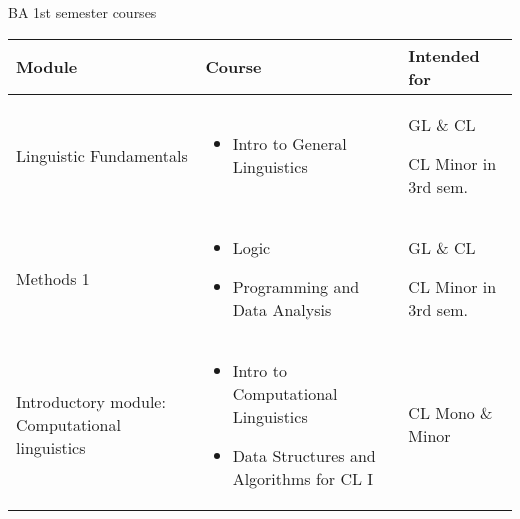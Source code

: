 \documentclass[aspectratio=169,hyperref={unicode},xcolor={dvipsnames}]{beamer}
\begin{document}
\begin{frame}{BA 1st semester courses}
\small
	\begin{center}
	\begin{table}[h]
		\begin{tabular}{p{}|p{}|p{}} 
		Module & Course & Intended for\\
		\hline
		Linguistic Fundamentals & \begin{itemize}\item Intro to General Linguistics\end{itemize} & GL \& CL \newline \begin{footnotesize}CL Minor in 3rd sem.\end{footnotesize}\\
		\hline
		Methods 1 & \begin{itemize}\item Logic \item Programming and Data Analysis\end{itemize} &  GL \& CL \newline \begin{footnotesize}CL Minor in 3rd sem.\end{footnotesize}\\
		\hline
		Introductory module: \newline Computational linguistics &  \begin{itemize}\item Intro to Computational Linguistics \item Data Structures and Algorithms for CL I \end{itemize}& CL \newline Mono \& Minor\\			
			\hline
\end{tabular}
\end{table}
	\end{center}
\end{frame}
\end{document}
